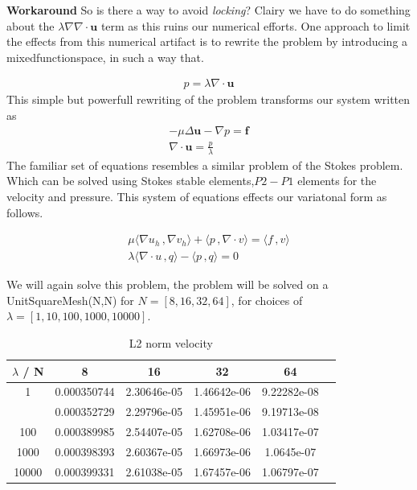 \documentclass[a4paper,norsk]{article}
\begin{document}
\textbf{Workaround}
So is there a way to avoid \textit{locking}? Clairy we have to do something about the $\lambda \nabla \nabla \cdot \textbf{u}$ term as this ruins our numerical efforts.
One approach to limit the effects from this numerical artifact is to rewrite
the problem by introducing a mixedfunctionspace, in such a way that.

\begin{align*}
p =  \lambda \nabla \cdot \textbf{u}
\end{align*}
This simple but powerfull rewriting of the problem transforms our system written as
\begin{align*}
-\mu \Delta \textbf{u} - \nabla p = \textbf{f} \\
\nabla \cdot \textbf{u} = \frac{p}{\lambda}
\end{align*}
The familiar set of equations resembles a similar problem of the Stokes problem. Which
can be solved using Stokes stable elements,$P2-P1$ elements for the velocity and
pressure. This system of equations effects our variatonal form as follows.

\begin{align*}
\mu \langle \nabla u_h \,, \nabla v_h \rangle + \langle p \,, \nabla \cdot v \rangle = \langle f \,, v \rangle \\
\lambda \langle \nabla \cdot u \,, q \rangle - \langle p \,, q \rangle = 0
\end{align*}

We will again solve this problem, the problem will be solved on a UnitSquareMesh(N,N) for $N = [8, 16, 32, 64]$, for
choices of $\lambda = [1, 10, 100, 1000, 10000]$.

\begin{table}[ht]
\caption {L2 norm velocity}
\centering
\begin{tabular}{c|ccccc}
\hline
\rowcolor{LightCyan}
$\lambda$ / N  & 8 & 16 & 32 & 64\\
\hline
1     & 0.000350744 & 2.30646e-05 & 1.46642e-06 & 9.22282e-08 \\ \hline
\rowcolor{LightCyan} \hline
10    & 0.000352729 & 2.29796e-05 & 1.45951e-06 & 9.19713e-08 \\ \hline
100   & 0.000389985 & 2.54407e-05 & 1.62708e-06 & 1.03417e-07 \\ \hline
\rowcolor{LightCyan}
1000  & 0.000398393 & 2.60367e-05 & 1.66973e-06 & 1.0645e-07  \\ \hline
10000 & 0.000399331 & 2.61038e-05 & 1.67457e-06 & 1.06797e-07 \\
\hline
\end{tabular}
\end{table}
\end{document}
